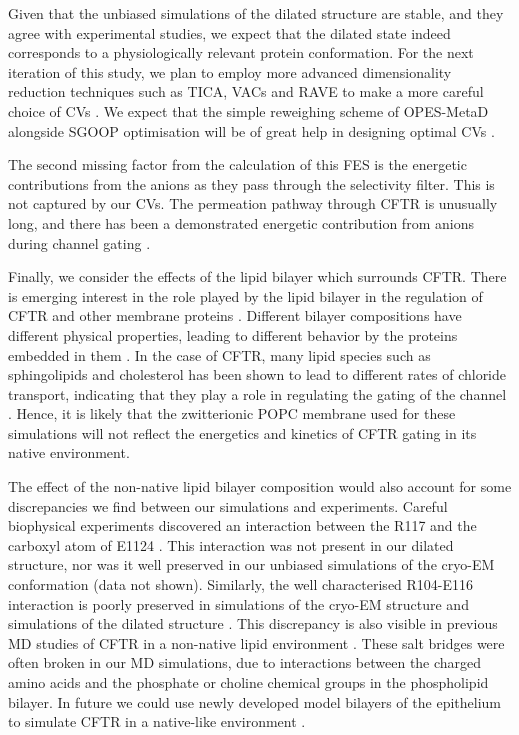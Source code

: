 Given that the unbiased simulations of the dilated structure are stable, and they agree with experimental studies, we expect that the dilated state indeed corresponds to a physiologically relevant protein conformation. For the next iteration of this study, we plan to employ more advanced dimensionality reduction techniques such as TICA, VACs and RAVE to make a more careful choice of CVs \cite{brotzakis2019, noe2001, schultze2021, brotzakis2019, ribeiro2018}. We expect that the simple reweighing scheme of OPES-MetaD alongside SGOOP optimisation will be of great help in designing optimal CVs \cite{invernizzi2020, invernizzi2022, smith2018, tiwary2016b}. 

The second missing factor from the calculation of this FES is the energetic contributions from the anions as they pass through the selectivity filter. This is not captured by our CVs. The permeation pathway through CFTR is unusually long, and there has been a demonstrated energetic contribution from anions during channel gating \cite{gong2004, gong2003, gong2003a, tabcharani1993, zhou2002, sorum2015, yeh2015}. 

Finally, we consider the effects of the lipid bilayer which surrounds CFTR. There is emerging interest in the role played by the lipid bilayer in the regulation of CFTR and other membrane proteins \cite{cottrill2020, lin2022, kapoor2021, farinha2018, cui2020, chin2018}. Different bilayer compositions have different physical properties, leading to different behavior by the proteins embedded in them \cite{hickey2011}. In the case of CFTR, many lipid species such as sphingolipids and cholesterol has been shown to lead to different rates of chloride transport, indicating that they play a role in regulating the gating of the channel \cite{aureli2016, farinha2018, cottrill2020}. Hence, it is likely that the zwitterionic POPC membrane used for these simulations will not reflect the energetics and kinetics of CFTR gating in its native environment.

The effect of the non-native lipid bilayer composition would also account for some discrepancies we find between our simulations and experiments. Careful biophysical experiments discovered an interaction between the R117 and the carboxyl atom of E1124 \cite{simon2021}. This interaction was not present in our dilated structure, nor was it well preserved in our unbiased simulations of the cryo-EM conformation (data not shown). Similarly, the well characterised R104-E116 interaction is poorly preserved in simulations of the cryo-EM structure and simulations of the dilated structure \cite{cui2014}. This discrepancy is also visible in previous MD studies of CFTR in a non-native lipid environment \cite{zeng2021}. These salt bridges were often broken in our MD simulations, due to interactions between the charged amino acids and the phosphate or choline chemical groups in the phospholipid bilayer. In future we could use newly developed model bilayers of the epithelium to simulate CFTR in a native-like environment \cite{wilson2021}. 

